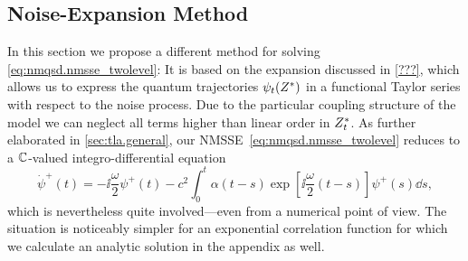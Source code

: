 \subsection{Noise-Expansion Method}
\label{sub:nmqsd.expansion}

In this section we propose a different method for solving \autoref{eq:nmqsd.nmsse_twolevel}:
It is based on the expansion discussed in \autoref{???}, which allows us to express the quantum trajectories $\psitZ$ in a functional Taylor series with respect to the noise process.
Due to the particular coupling structure of the model we can neglect all terms higher than linear order in ${Z}^*_t$.
As further elaborated in \autoref{sec:tla.general}, our NMSSE~\ref{eq:nmqsd.nmsse_twolevel} reduces to a $\mathbb{C}$-valued integro-differential equation
\begin{equation}
  \dot\psi^+(t) = -\ii \frac{\omega}{2} \psi^+(t) - c^2 \int_0^t \alpha(t - s) \exp[\ii \frac{\omega}{2} (t - s)] \psi^+(s) \dd s,
  \label{eq:nmqsd.dotpsi_plus}
\end{equation}
which is nevertheless quite involved---even from a numerical point of view.
The situation is noticeably simpler for an exponential correlation function for which we calculate an analytic solution in the appendix as well.

